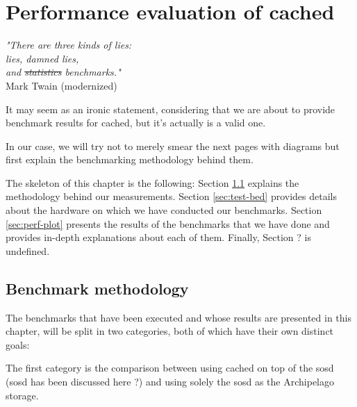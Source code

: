 \chapter{Performance evaluation of cached}\label{ch:cached-evaluation}

\begin{flushright}
	\textit{"There are three kinds of lies:\\
		lies, damned lies, \\
		and \sout{statistics} benchmarks."}	\\

	Mark Twain (modernized)
\end{flushright}

It may seem as an ironic statement, considering that we are about to provide 
benchmark results for cached, but it's actually is a valid one.
\begin{comment}
What Mr.  Twain tries to say here
\footnote{
	and that's a phrase usually not heard in programming contexts...
}
is that the presentation of partials facts for something can be used to 
fabricate a plausible truth for it.
In science's case, it so often happens that promising results for an experiment 
can seem more important to the researcher's eye than negative ones due to 
positive reinforcement.
\end{comment}
In our case, we will try not to merely smear the next pages with diagrams but 
first explain the benchmarking methodology behind them.

The skeleton of this chapter is the following: Section \ref{sec:perf-meth} 
explains the methodology behind our measurements. Section \ref{sec:test-bed} 
provides details about the hardware on which we have conducted our benchmarks. 
Section \ref{sec:perf-plot} presents the results of the benchmarks that we have 
done and provides in-depth explanations about each of them.  Finally, Section ?  
is undefined.

\section{Benchmark methodology}\label{sec:perf-meth}

The benchmarks that have been executed and whose results are presented in this 
chapter, will be split in two categories, both of which have their own distinct 
goals:

The first category is the comparison between using cached on top of the sosd 
(sosd has been discussed here ?) and using solely the sosd as the Archipelago 
storage.
\begin{comment}
The category's goal is to "defend" one of the core thesis arguments, that 
tiering is a key element that will improve the performance of Archipelago.  
\end{comment}

